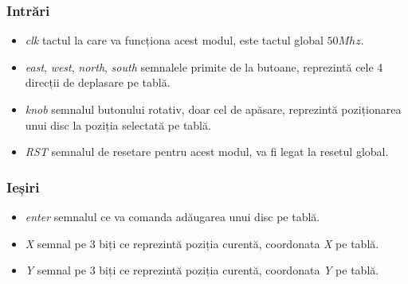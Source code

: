 \documentclass[12pt,twoside,a4paper,fleqn]{book}
\theoremstyle{definition}
\begin{document}
\subsubsection{Intrări}
\begin{itemize}
\item \emph{clk} tactul la care va funcționa acest modul, este tactul global $50Mhz$.
\item \emph{east}, \emph{west}, \emph{north}, \emph{south} semnalele primite de la butoane, reprezintă cele 4 direcții de deplasare pe tablă.
\item \emph{knob} semnalul butonului rotativ, doar cel de apăsare, reprezintă poziționarea unui disc la poziția selectată pe tablă.
\item \emph{RST} semnalul de resetare pentru acest modul, va fi legat la resetul global.
\end{itemize}

\subsubsection{Ieșiri}
\begin{itemize}
\item \emph{enter} semnalul ce va comanda adăugarea unui disc pe tablă.
\item \emph{X} semnal pe $3$ biți ce reprezintă poziția curentă, coordonata \emph{X} pe tablă.
\item \emph{Y} semnal pe $3$ biți ce reprezintă poziția curentă, coordonata \emph{Y} pe tablă.
\end{itemize}
\end{document}
